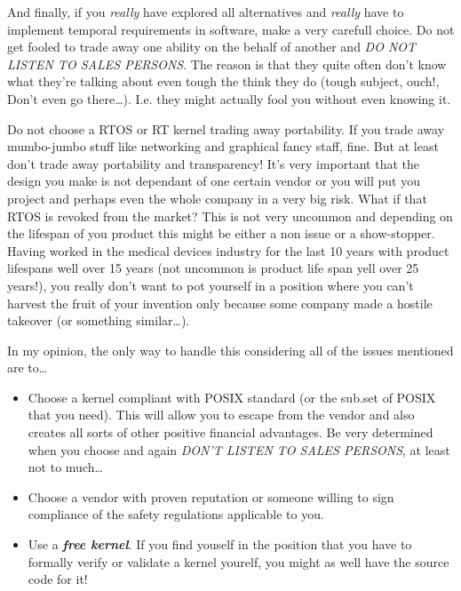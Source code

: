And finally, if you \textit{really} have explored all alternatives and \textit{really} have to implement temporal requirements in software, make a very carefull choice. Do not get fooled to trade away one ability on the behalf of another and \textit{DO NOT LISTEN TO SALES PERSONS}. The reason is that they quite often don't know what they're talking about even tough the think they do (tough subject, ouch!, Don't even go there\ldots). I.e. they might actually fool you without even knowing it.

Do not choose a RTOS or RT kernel trading away portability. If you trade away mumbo-jumbo stuff like networking and graphical fancy staff, fine. But at least don't trade away portability and transparency! It's very important that the design you make is not dependant of one certain vendor or you will put you project and perhaps even the whole company in a very big risk. What if that RTOS is revoked from the market? This is not very uncommon and depending on the lifespan of you product this might be either a non issue or a show-stopper. Having worked in the medical devices industry for the last 10 years with product lifespans well over 15 years (not uncommon is product life span yell over 25 years!), you really don't want to pot yourself in a position where you can't harvest the fruit of your invention only because some company made a hostile takeover (or something similar\ldots).

In my opinion, the only way to handle this considering all of the issues mentioned are to\ldots
\begin{itemize}
\item Choose a kernel compliant with POSIX standard (or the sub.set of POSIX that you need). This will allow you to escape from the vendor and also creates all sorts of other positive financial advantages. Be very determined when you choose and again \textit{DON'T LISTEN TO SALES PERSONS}, at least not to much\ldots
\item Choose a vendor with proven reputation or someone willing to sign compliance of the safety regulations applicable to you.
\item Use a \textit{\textbf{free kernel}}. If you find youself in the position that you have to formally verify or validate a kernel yourelf, you might as well have the source code for it!
\end{itemize}
